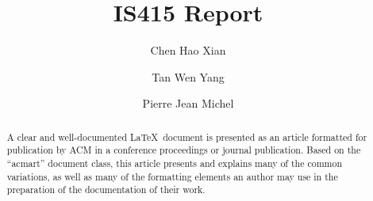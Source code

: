 \documentclass[manuscript,screen]{acmart}
\begin{document}
\title{IS415 Report}



  \author{Chen Hao Xian}
  
    \author{Tan Wen Yang}
  
    \author{Pierre Jean Michel}
  
      

\begin{abstract}
A clear and well-documented \LaTeX~document is presented as an article
formatted for publication by ACM in a conference proceedings or journal
publication. Based on the ``acmart'' document class, this article
presents and explains many of the common variations, as well as many of
the formatting elements an author may use in the preparation of the
documentation of their work.    
\end{abstract}




\maketitle
\end{document}
